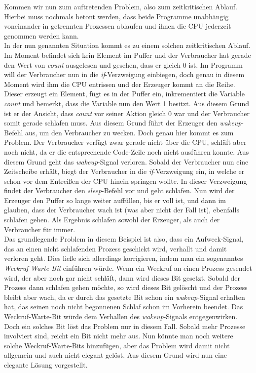 \begin{description}
\begin{description}
								
								
								Kommen wir nun zum auftretenden Problem, also zum zeitkritischen Ablauf. Hierbei muss nochmals betont werden, dass beide Programme unabhängig voneinander in getrennten Prozessen ablaufen und ihnen die CPU jederzeit genommen werden kann.\\
								In der nun genannten Situation kommt es zu einem solchen zeitkritischen Ablauf. Im Moment befindet sich kein Element im Puffer und der Verbraucher hat gerade den Wert von \textit{count} ausgelesen und gesehen, dass er gleich 0 ist. Im Programm will der Verbraucher nun in die \textit{if}-Verzweigung einbiegen, doch genau in diesem Moment wird ihm die CPU entrissen und der Erzeuger kommt an die Reihe. Dieser erzeugt ein Element, fügt es in der Puffer ein, inkrementiert die Variable \textit{count} und bemerkt, dass die Variable nun den Wert 1 besitzt. Aus diesem Grund ist er der Ansicht, dass \textit{count} vor seiner Aktion gleich 0 war und der Verbraucher somit gerade schlafen muss. Aus diesem Grund führt der Erzeuger den \textit{wakeup}-Befehl aus, um den Verbraucher zu wecken. Doch genau hier kommt es zum Problem. Der Verbraucher verfügt zwar gerade nicht über die CPU, schläft aber noch nicht, da er die entsprechende Code-Zeile noch nicht ausführen konnte. Aus diesem Grund geht das \textit{wakeup}-Signal verloren. Sobald der Verbraucher nun eine Zeitscheibe erhält, biegt der Verbraucher in die \textit{if}-Verzweigung ein, in welche er schon vor dem Entreißen der CPU hinein springen wollte. In dieser Verzweigung findet der Verbraucher den \textit{sleep}-Befehl vor und geht schlafen. Nun wird der Erzeuger den Puffer so lange weiter auffüllen, bis er voll ist, und dann im glauben, dass der Verbraucher wach ist (was aber nicht der Fall ist), ebenfalls schlafen gehen. Als Ergebnis schlafen sowohl der Erzeuger, als auch der Verbraucher für immer. \cite{BetriebssystemeNetzmafia}\\
								Das grundlegende Problem in diesem Beispiel ist also, dass ein Aufweck-Signal, das an einen nicht schlafenden Prozess geschickt wird, verhallt und damit verloren geht. Dies ließe sich allerdings korrigieren, indem man ein sogenanntes \textit{Weckruf-Warte-Bit} einführen würde. Wenn ein Weckruf an einen Prozess gesendet wird, der aber noch gar nicht schläft, dann wird dieses Bit gesetzt. Sobald der Prozess dann schlafen gehen möchte, so wird dieses Bit gelöscht und der Prozess bleibt aber wach, da er durch das gesetzte Bit schon ein \textit{wakeup}-Signal erhalten hat, das seinen noch nicht begonnenen Schlaf schon im Vorherein beendet. Das Weckruf-Warte-Bit würde dem Verhallen des \textit{wakeup}-Signals entgegenwirken.\\
								Doch ein solches Bit löst das Problem nur in diesem Fall. Sobald mehr Prozesse involviert sind, reicht ein Bit nicht mehr aus. Nun könnte man noch weitere solche Weckruf-Warte-Bits hinzufügen, aber das Problem wird damit nicht allgemein und auch nicht elegant gelöst.
								Aus diesem Grund wird nun eine elegante Lösung vorgestellt. \cite{ModerneBetriebssysteme}
								

\end{description}
\end{description}
